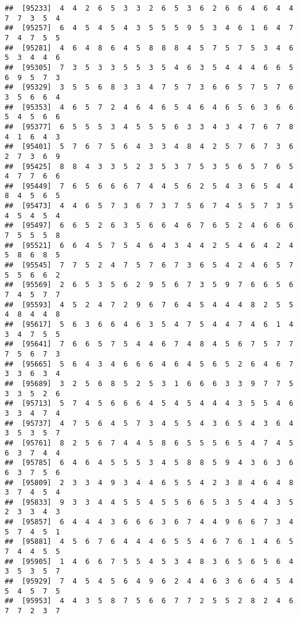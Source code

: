 \documentclass[
]{book}
\begin{document}
\begin{verbatim}
##  [95233]  4  4  2  6  5  3  3  2  6  5  3  6  2  6  6  4  6  4  4  7  7  3  5  4
##  [95257]  6  4  5  4  5  4  3  5  5  5  9  5  3  4  6  1  6  4  7  7  4  7  5  5
##  [95281]  4  6  4  8  6  4  5  8  8  8  4  5  7  5  7  5  3  4  6  5  3  4  4  6
##  [95305]  7  3  5  3  3  5  5  3  5  4  6  3  5  4  4  4  6  6  5  6  9  5  7  3
##  [95329]  3  5  5  6  8  3  3  4  7  5  7  3  6  6  5  7  5  7  6  3  5  6  6  4
##  [95353]  4  6  5  7  2  4  6  4  6  5  4  6  4  6  5  6  3  6  6  5  4  5  6  6
##  [95377]  6  5  5  5  3  4  5  5  5  6  3  3  4  3  4  7  6  7  8  4  1  6  4  3
##  [95401]  5  7  6  7  5  6  4  3  3  4  8  4  2  5  7  6  7  3  6  2  7  3  6  9
##  [95425]  8  8  4  3  3  5  2  3  5  3  7  5  3  5  6  5  7  6  5  4  7  7  6  6
##  [95449]  7  6  5  6  6  6  7  4  4  5  6  2  5  4  3  6  5  4  4  8  4  5  6  5
##  [95473]  4  4  6  5  7  3  6  7  3  7  5  6  7  4  5  5  7  3  5  4  5  4  5  4
##  [95497]  6  6  5  2  6  3  5  6  6  4  6  7  6  5  2  4  6  6  6  7  5  5  5  8
##  [95521]  6  6  4  5  7  5  4  6  4  3  4  4  2  5  4  6  4  2  4  5  8  6  8  5
##  [95545]  7  7  5  2  4  7  5  7  6  7  3  6  5  4  2  4  6  5  7  5  5  6  6  2
##  [95569]  2  6  5  3  5  6  2  9  5  6  7  3  5  9  7  6  6  5  6  7  4  5  7  7
##  [95593]  4  5  2  4  7  2  9  6  7  6  4  5  4  4  4  8  2  5  5  4  8  4  4  8
##  [95617]  5  6  3  6  6  4  6  3  5  4  7  5  4  4  7  4  6  1  4  3  4  7  5  5
##  [95641]  7  6  6  5  7  5  4  4  6  7  4  8  4  5  6  7  5  7  7  7  5  6  7  3
##  [95665]  5  6  4  3  4  6  6  6  4  6  4  5  6  5  2  6  4  6  7  3  3  6  3  4
##  [95689]  3  2  5  6  8  5  2  5  3  1  6  6  6  3  3  9  7  7  5  3  3  5  2  6
##  [95713]  5  7  4  5  6  6  6  4  5  4  5  4  4  4  3  5  5  4  6  3  3  4  7  4
##  [95737]  4  7  5  6  4  5  7  3  4  5  5  4  3  6  5  4  3  6  4  3  5  3  5  7
##  [95761]  8  2  5  6  7  4  4  5  8  6  5  5  5  6  5  4  7  4  5  6  3  7  4  4
##  [95785]  6  4  6  4  5  5  5  3  4  5  8  8  5  9  4  3  6  3  6  6  3  7  5  6
##  [95809]  2  3  3  4  9  3  4  4  6  5  5  4  2  3  8  4  6  4  8  3  7  4  5  4
##  [95833]  9  3  3  4  4  5  5  4  5  5  6  6  5  3  5  4  4  3  5  2  3  3  4  3
##  [95857]  6  4  4  4  3  6  6  6  3  6  7  4  4  9  6  6  7  3  4  5  7  4  5  1
##  [95881]  4  5  6  7  6  4  4  4  6  5  5  4  6  7  6  1  4  6  5  7  4  4  5  5
##  [95905]  1  4  6  6  7  5  5  4  5  3  4  8  3  6  5  6  5  6  4  3  5  3  5  7
##  [95929]  7  4  5  4  5  6  4  9  6  2  4  4  6  3  6  6  4  5  4  5  4  5  7  5
##  [95953]  4  4  3  5  8  7  5  6  6  7  7  2  5  5  2  8  2  4  6  7  7  2  3  7

\end{verbatim}
\end{document}
